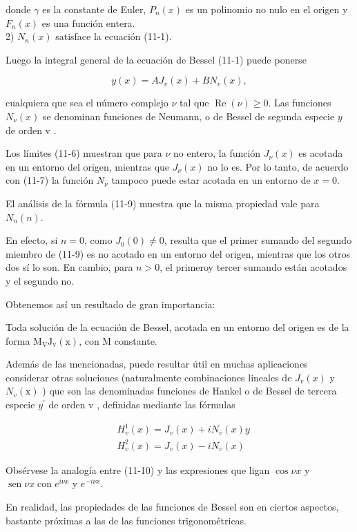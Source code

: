 \documentclass[10pt]{article}
\theoremstyle{plain}
\theoremstyle{definition}
\theoremstyle{remark}
\begin{document}
donde $\gamma$ es la constante de Euler, $P_{n}(x)$ es un polinomio no nulo en el origen y $F_{n}(x)$ es una función entera.\\
2) $N_{n}(x)$ satisface la ecuación (11-1).

Luego la integral general de la ecuación de Bessel (11-1) puede ponerse

$$
y(x)=A J_{v}(x)+B N_{v}(x),
$$

cualquiera que sea el número complejo $\nu$ tal que $\operatorname{Re}(\nu) \geqslant 0$. Las funciones $N_{\nu}(x)$ se denominan funciones de Neumann, o de Bessel de segunda especie $y$ de orden v .

Los límites (11-6) muestran que para $\nu$ no entero, la función $J_{\nu}(x)$ es acotada en un entorno del origen, mientras que $J_{\nu}(x)$ no lo es. Por lo tanto, de acuerdo con (11-7) la función $N_{\nu}$ tampoco puede estar acotada en un entorno de $x=0$.

El análisis de la fórmula (11-9) muestra que la misma propiedad vale para $N_{n}(n)$.

En efecto, si $n=0$, como $J_{0}(0) \neq 0$, resulta que el primer sumando del segundo miembro de (11-9) es no acotado en un entorno del origen, mientras que los otros dos sí lo son. En cambio, para $n>0$, el primeroy tercer sumando están acotados y el segundo no.

Obtenemos así un resultado de gran importancia:

Toda solución de la ecuación de Bessel, acotada en un entorno del origen es de la forma $\mathrm{M}_{\mathrm{V}} \mathrm{J}_{\mathrm{v}}(\mathrm{x})$, con M constante.

Además de las mencionadas, puede resultar útil en muchas aplicaciones considerar otras soluciones (naturalmente combinaciones lineales de $J_{v}(x)$ y $N_{v}(\mathrm{x})$ ) que son las denominadas funciones de Hankel o de Bessel de tercera especie $y^{\prime}$ de orden v , definidas mediante las fórmulas


\begin{align*}
& H_{v}^{1}(x)=J_{v}(x)+i N_{v}(x) y  \tag{11-10}\\
& H_{v}^{2}(x)=J_{v}(x)-i N_{v}(x)
\end{align*}


Obsérvese la analogía entre (11-10) y las expresiones que ligan $\cos \nu x$ y $\operatorname{sen} \nu x \operatorname{con} e^{i \nu x}$ y $e^{-i \nu x}$.

En realidad, las propiedades de las funciones de Bessel son en ciertos aspectos, bastante próximas a las de las funciones trigonométricas.
\end{document}
